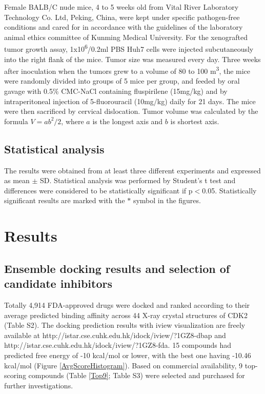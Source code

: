 \documentclass[10pt]{article}
\begin{document}
Female BALB/C nude mice, 4 to 5 weeks old from Vital River Laboratory Technology Co. Ltd, Peking, China, were kept under specific pathogen-free conditions and cared for in accordance with the guidelines of the laboratory animal ethics committee of Kunming Medical University. For the xenografted tumor growth assay, 1x10\textsuperscript{6}/0.2ml PBS Huh7 cells were injected subcutaneously into the right flank of the mice. Tumor size was measured every day. Three weeks after inoculation when the tumors grew to a volume of 80 to 100 m\textsuperscript{3}, the mice were randomly divided into groups of 5 mice per group, and feeded by oral gavage with 0.5\% CMC-NaCl containing fluspirilene (15mg/kg) and by intraperitoneal injection of 5-fluorouracil (10mg/kg) daily for 21 days. The mice were then sacrificed by cervical dislocation. Tumor volume was calculated by the formula $V=ab^2/2$, where $a$ is the longest axis and $b$ is shortest axis.

\subsection*{Statistical analysis}

The results were obtained from at least three different experiments and expressed as mean $\pm$ SD. Statistical analysis was performed by Student's t test and differences were considered to be statistically significant if p$<$0.05. Statistically significant results are marked with the $\ast$ symbol in the figures.

\section*{Results}

\subsection*{Ensemble docking results and selection of candidate inhibitors}

Totally 4,914 FDA-approved drugs were docked and ranked according to their average predicted binding affinity across 44 X-ray crystal structures of CDK2 (Table S2). The docking prediction results with iview visualization \cite{1366} are freely available at http://istar.cse.cuhk.edu.hk/idock/iview/?1GZ8-dbap and http://istar.cse.cuhk.edu.hk/idock/iview/?1GZ8-fda. 15 compounds had predicted free energy of -10 kcal/mol or lower, with the best one having -10.46 kcal/mol (Figure \ref{AvgScoreHistogram}). Based on commercial availability, 9 top-scoring compounds (Table \ref{Top9}; Table S3) were selected and purchased for further investigations.
\end{document}
